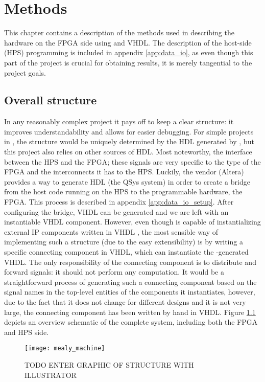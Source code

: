 \chapter{Methods}
This chapter contains a description of the methods used in describing the hardware on the FPGA side using \clash{} and VHDL. The description of the host-side (HPS) programming is included in appendix \ref{app:data_io}, as even though this part of the project is crucial for obtaining results, it is merely tangential to the project goals. 

\section{Overall structure}
In any reasonably complex project it pays off to keep a clear structure: it improves understandability and allows for easier debugging. For simple projects in \clash{}, the structure would be uniquely determined by the HDL generated by \clash{}, but this project also relies on other sources of HDL. Most noteworthy, the interface between the HPS and the FPGA; these signals are very specific to the type of the FPGA and the interconnects it has to the HPS. Luckily, the vendor (Altera) provides a way to generate HDL (the QSys system) in order to create a bridge from the host code running on the HPS to the programmable hardware, the FPGA. This process is described in appendix \ref{app:data_io_setup}. After configuring the bridge, VHDL can be generated and we are left with an instantiable VHDL component. However, even though \clash{} is capable of instantializing external IP components written in VHDL \cite{CLaSHBlogTut}, the most sensible way of implementing such a structure (due to the easy extensibility) is by writing a specific connecting component in VHDL, which can instantiate the \clash{}-generated VHDL. The only responsibility of the connecting component is to distribute and forward signals: it should not perform any computation. It would be a straightforward process of generating such a connecting component based on the signal names in the top-level entities of the components it instantiates, however, due to the fact that it does not change for different designs and it is not very large, the connecting component has been written by hand in VHDL. Figure \ref{f:large_structure} depicts an overview schematic of the complete system, including both the FPGA and HPS side.

\begin{figure}[h]
	\centering
	\texttt{[image: mealy\_machine]}
	\caption{TODO ENTER GRAPHIC OF STRUCTURE WITH ILLUSTRATOR}
	\label{f:large_structure}
\end{figure}

